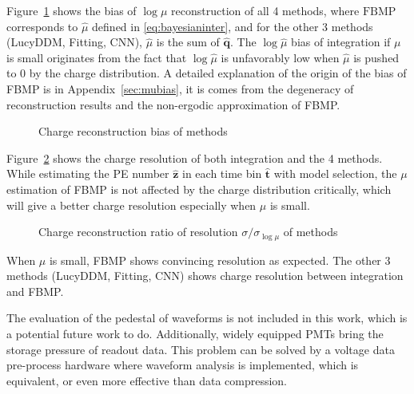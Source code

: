 Figure~\ref{fig:biasmu} shows the bias of $\log\mu$ reconstruction of all 4 methods, where $\mathrm{FBMP}$ corresponds to $\hat{\mu}$ defined in \eqref{eq:bayesianinter}, and for the other 3 methods (LucyDDM, Fitting, CNN), $\hat{\mu}$ is the sum of $\hat{\bm{q}}$. The $\log\hat{\mu}$ bias of integration if $\mu$ is small originates from the fact that $\log\hat{\mu}$ is unfavorably low when $\hat{\mu}$ is pushed to 0 by the charge distribution. A detailed explanation of the origin of the bias of FBMP is in Appendix~\ref{sec:mubias}, it is comes from the degeneracy of reconstruction results and the non-ergodic approximation of FBMP. 

\begin{figure}[H]
    \centering
    \resizebox{\textwidth}{!}{}
    \caption{\label{fig:biasmu} Charge reconstruction bias of methods}
\end{figure}

Figure~\ref{fig:deltamu} shows the charge resolution of both integration and the 4 methods. While estimating the PE number $\hat{\bm{z}}$ in each time bin $\hat{\bm{t}}$ with model selection, the $\mu$ estimation of FBMP is not affected by the charge distribution critically, which will give a better charge resolution especially when $\mu$ is small. 

\begin{figure}[H]
    \centering
    \resizebox{\textwidth}{!}{}
    \caption{\label{fig:deltamu} Charge reconstruction ratio of resolution $\sigma/\sigma_{\log\mu}$ of methods}
\end{figure}

When $\mu$ is small, FBMP shows convincing resolution as expected. The other 3 methods (LucyDDM, Fitting, CNN) shows charge resolution between integration and FBMP. 


The evaluation of the pedestal of waveforms is not included in this work, which is a potential future work to do. Additionally, widely equipped PMTs bring the storage pressure of readout data. This problem can be solved by a voltage data pre-process hardware where waveform analysis is implemented, which is equivalent, or even more effective than data compression. 

